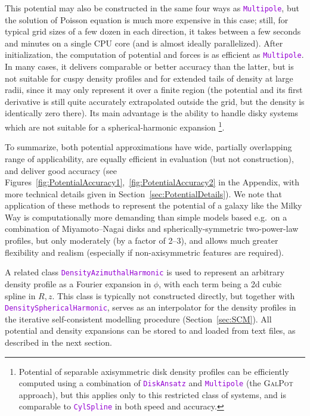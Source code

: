 \documentclass[12pt]{article}
\newcommand{\ttt}[1]{\textcolor{darkviolet}{\texttt{#1}}}
\begin{document}
This potential may also be constructed in the same four ways as \ttt{Multipole}, but the solution of Poisson equation is much more expensive in this case; still, for typical grid sizes of a few dozen in each direction, it takes between a few seconds and minutes on a single CPU core (and is almost ideally parallelized). After initialization, the computation of potential and forces is as efficient as \ttt{Multipole}. In many cases, it delivers comparable or better accuracy than the latter, but is not suitable for cuspy density profiles and for extended tails of density at large radii, since it may only represent it over a finite region (the potential and its first derivative is still quite accurately extrapolated outside the grid, but the density is identically zero there). Its main advantage is the ability to handle disky systems which are not suitable for a spherical-harmonic expansion%
\footnote{Potential of separable axisymmetric disk density profiles can be efficiently computed using a combination of \ttt{DiskAnsatz} and \ttt{Multipole} (the \textsc{GalPot} approach), but this applies only to this restricted class of systems, and is comparable to \ttt{CylSpline} in both speed and accuracy.}.

To summarize, both potential approximations have wide, partially overlapping range of applicability, are equally efficient in evaluation (but not construction), and deliver good accuracy (see Figures~\ref{fig:PotentialAccuracy1},~\ref{fig:PotentialAccuracy2} in the Appendix, with more technical details given in Section~\ref{sec:PotentialDetails}).
We note that application of these methods to represent the potential of a galaxy like the Milky Way is computationally more demanding than simple models based e.g.\ on a combination of Miyamoto--Nagai disks and spherically-symmetric two-power-law profiles, but only moderately (by a factor of 2--3), and allows much greater flexibility and realism (especially if non-axisymmetric features are required).

A related class \ttt{DensityAzimuthalHarmonic} is used to represent an arbitrary density profile as a Fourier expansion in $\phi$, with each term being a 2d cubic spline in $R,z$. This class is typically not constructed directly, but together with \ttt{DensitySphericalHarmonic}, serves as an interpolator for the density profiles in the iterative self-consistent modelling procedure (Section~\ref{sec:SCM}). All potential and density expansions can be stored to and loaded from text files, as described in the next section.
\end{document}

